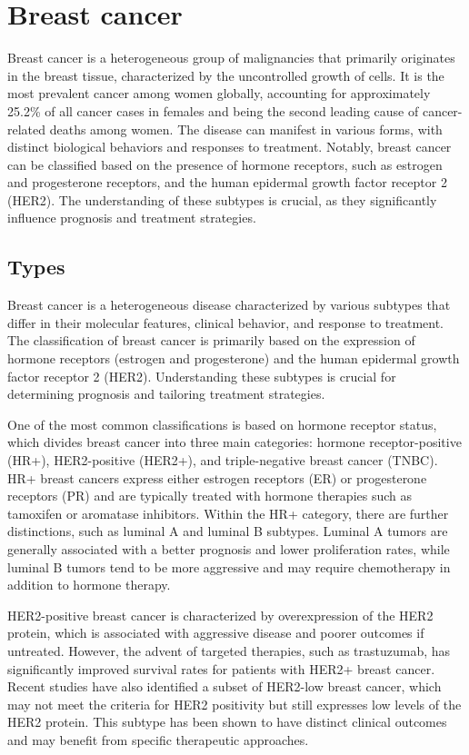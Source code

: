 \section{Breast cancer}
Breast cancer is a heterogeneous group of malignancies that primarily
originates in the breast tissue, characterized by the uncontrolled growth of
cells.
It is the most prevalent cancer among women globally, accounting for
approximately 25.2\% of all cancer cases in females and being the second
leading cause of cancer-related deaths among women\supercite{pace_breast_2016}.
The disease can manifest in various forms, with distinct biological behaviors
and responses to treatment.
Notably, breast cancer can be classified based on the presence of hormone
receptors, such as estrogen and progesterone receptors, and the human epidermal
growth factor receptor 2 (HER2)\supercite{eccles_critical_2013}.
The understanding of these subtypes is crucial, as they significantly influence
prognosis and treatment strategies.

\subsection{Types}

Breast cancer is a heterogeneous disease characterized by various subtypes that
differ in their molecular features, clinical behavior, and response to
treatment.
The classification of breast cancer is primarily based on the expression of
hormone receptors (estrogen and progesterone) and the human epidermal growth
factor receptor 2 (HER2).
Understanding these subtypes is crucial for determining prognosis and tailoring
treatment strategies.

One of the most common classifications is based on hormone receptor status,
which divides breast cancer into three main categories: hormone
receptor-positive (HR+), HER2-positive (HER2+), and triple-negative breast
cancer (TNBC).
HR+ breast cancers express either estrogen receptors (ER) or progesterone
receptors (PR) and are typically treated with hormone therapies such as
tamoxifen or aromatase inhibitors\supercite{geyer_molecular_2012}.
Within the HR+ category, there are further distinctions, such as luminal A and
luminal B subtypes.
Luminal A tumors are generally associated with a better prognosis and lower
proliferation rates, while luminal B tumors tend to be more aggressive and may
require chemotherapy in addition to hormone
therapy\supercite{geyer_molecular_2012}.

HER2-positive breast cancer is characterized by overexpression of the HER2
protein, which is associated with aggressive disease and poorer outcomes if
untreated.
However, the advent of targeted therapies, such as trastuzumab, has
significantly improved survival rates for patients with HER2+ breast
cancer\supercite{modi_antitumor_2020}.
Recent studies have also identified a subset of HER2-low breast cancer, which
may not meet the criteria for HER2 positivity but still expresses low levels of
the HER2 protein.
This subtype has been shown to have distinct clinical outcomes and may benefit
from specific therapeutic
approaches\supercite{won_clinical_2022,mutai_prognostic_2021}.

